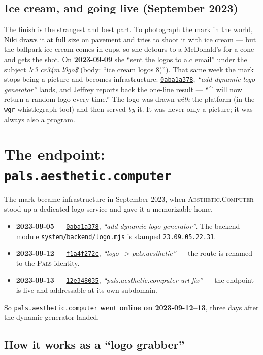 \documentclass[10pt,letterpaper,twocolumn]{article}
\newcommand{\ac}{\textsc{Aesthetic}{\color{acpink}.}\textsc{Computer}}
\newcommand{\pals}{\textsc{Pals}}
\newcommand{\commit}[2]{\href{https://github.com/whistlegraph/aesthetic-computer/commit/#1}{\texttt{#1}}, \emph{``#2''}}
\newcommand{\repofile}[1]{\href{https://github.com/whistlegraph/aesthetic-computer/blob/main/#1}{\texttt{#1}}}
\begin{document}
\subsection{Ice cream, and going live (September 2023)}
The finish is the strangest and best part. To photograph the mark in the
world, Niki draws it at full size on pavement and tries to shoot it with
ice cream --- but the ballpark ice cream comes in cups, so she detours to a
McDonald's for a cone and gets the shot. On \textbf{2023-09-09} she ``sent
the logos to a.c email'' under the subject \emph{!c3 cr34m l0go\$} (body:
``ice cream logos 8)''). That same week the mark stops being a picture and becomes
infrastructure: \commit{0aba1a378}{add dynamic logo generator} lands, and
Jeffrey reports back the one-line result --- ``\^{}\ will now return a random
logo every time.'' The logo was drawn \emph{with} the platform (in the
\texttt{wgr} whistlegraph tool) and then served \emph{by} it. It was never
only a picture; it was always also a program.

\section{The endpoint: \texttt{pals.aesthetic.computer}}

The mark became infrastructure in September 2023, when \ac{} stood up a
dedicated logo service and gave it a memorizable home.

\begin{itemize}
  \item \textbf{2023-09-05} --- \commit{0aba1a378}{add dynamic logo
        generator}. The backend module \repofile{system/backend/logo.mjs}
        is stamped \texttt{23.09.05.22.31}.
  \item \textbf{2023-09-12} --- \commit{f1a4f272c}{logo -> pals.aesthetic}
        --- the route is renamed to the \pals{} identity.
  \item \textbf{2023-09-13} --- \commit{12e348035}{pals.aesthetic.computer
        url fix} --- the endpoint is live and addressable at its own
        subdomain.
\end{itemize}

\noindent So \href{https://pals.aesthetic.computer}{\texttt{pals.aesthetic.computer}}
\textbf{went online on 2023-09-12--13}, three days after the dynamic
generator landed.

\subsection{How it works as a ``logo grabber''}
\end{document}
